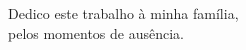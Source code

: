 
\begin{dedicatoria}
	\vspace*{\fill}
	\begin{flushright}
		Dedico este trabalho à minha família, \\
        pelos momentos de ausência.
	\end{flushright}
\end{dedicatoria}